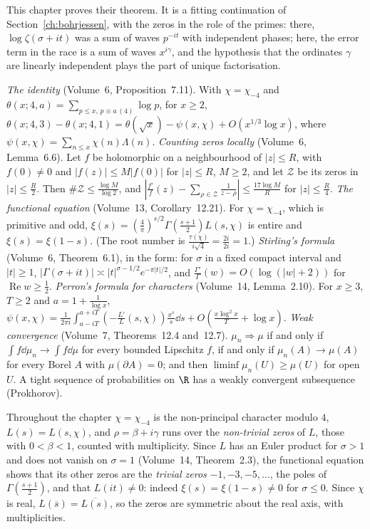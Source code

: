 This chapter proves their theorem. It is a fitting continuation of Section~\ref{ch:bohrjessen}, with the zeros in the role of the primes: there, $\log\zeta(\sigma+it)$ was a sum of waves $p^{-it}$ with independent phases; here, the error term in the race is a sum of waves $x^{i\gamma}$, and the hypothesis that the ordinates $\gamma$ are linearly independent plays the part of unique factorisation.

\begin{reminder}
\emph{The identity} (Volume~6, Proposition~7.11). With $\chi=\chi_{-4}$ and $\theta(x;4,a)=\sum_{p\le x,\,p\equiv a\,(4)}\log p$, for $x\ge2$,
$\theta(x;4,3)-\theta(x;4,1)=\theta(\sqrt x)-\psi(x,\chi)+O(x^{1/3}\log x)$, where $\psi(x,\chi)=\sum_{n\le x}\chi(n)\Lambda(n)$.
\emph{Counting zeros locally} (Volume~6, Lemma~6.6). Let $f$ be holomorphic on a neighbourhood of $|z|\le R$, with $f(0)\ne0$ and $|f(z)|\le M|f(0)|$ for $|z|\le R$, $M\ge2$, and let $\mathcal Z$ be its zeros in $|z|\le\frac R2$. Then $\#\mathcal Z\le\frac{\log M}{\log2}$, and $|\frac{f'}f(z)-\sum_{\rho\in\mathcal Z}\frac1{z-\rho}|\le\frac{17\log M}R$ for $|z|\le\frac R4$.
\emph{The functional equation} (Volume~13, Corollary~12.21). For $\chi=\chi_{-4}$, which is primitive and odd, $\xi(s)=(\frac4\pi)^{s/2}\Gamma(\frac{s+1}2)L(s,\chi)$ is entire and $\xi(s)=\xi(1-s)$. (The root number is $\frac{\tau(\chi)}{i\sqrt4}=\frac{2i}{2i}=1$.)
\emph{Stirling's formula} (Volume~6, Theorem~6.1), in the form: for $\sigma$ in a fixed compact interval and $|t|\ge1$, $|\Gamma(\sigma+it)|\asymp|t|^{\sigma-1/2}e^{-\pi|t|/2}$, and $\frac{\Gamma'}\Gamma(w)=O(\log(|w|+2))$ for $\operatorname{Re}w\ge\frac12$.
\emph{Perron's formula for characters} (Volume~14, Lemma~2.10). For $x\ge3$, $T\ge2$ and $a=1+\frac1{\log x}$, $\psi(x,\chi)=\frac1{2\pi i}\int_{a-iT}^{a+iT}(-\frac{L'}L(s,\chi))\frac{x^s}s\dd s+O(\frac{x\log^2x}T+\log x)$.
\emph{Weak convergence} (Volume~7, Theorems~12.4 and~12.7). $\mu_n\Rightarrow\mu$ if and only if $\int f\dd\mu_n\to\int f\dd\mu$ for every bounded Lipschitz $f$, if and only if $\mu_n(A)\to\mu(A)$ for every Borel $A$ with $\mu(\partial A)=0$; and then $\liminf\mu_n(U)\ge\mu(U)$ for open $U$. A tight sequence of probabilities on $\R$ has a weakly convergent subsequence (Prokhorov).
\end{reminder}

Throughout the chapter $\chi=\chi_{-4}$ is the non-principal character modulo $4$, $L(s)=L(s,\chi)$, and $\rho=\beta+i\gamma$ runs over the \emph{non-trivial zeros} of $L$, those with $0<\beta<1$, counted with multiplicity. Since $L$ has an Euler product for $\sigma>1$ and does not vanish on $\sigma=1$ (Volume~14, Theorem~2.3), the functional equation shows that its other zeros are the \emph{trivial zeros} $-1,-3,-5,\dots$, the poles of $\Gamma(\frac{s+1}2)$, and that $L(it)\ne0$: indeed $\xi(s)=\xi(1-s)\ne0$ for $\sigma\le0$. Since $\chi$ is real, $L(\overline s)=\overline{L(s)}$, so the zeros are symmetric about the real axis, with multiplicities.

